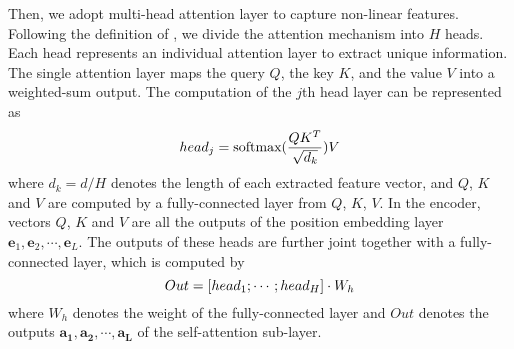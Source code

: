 Then, we adopt multi-head attention layer to capture non-linear features. Following the definition of \citet{transformer}, we divide the attention mechanism into $H$ heads. Each head represents an individual attention layer to extract unique information. The single attention layer maps the query $Q$, the key $K$, and the value $V$ into a weighted-sum output. The computation of the $j$th head layer can be represented as
\begin{equation}
    \vspace{-2mm}
    head_j = \text{softmax}(\frac{QK^T}{\sqrt{d_k}})V\label{eq:att2}
    \vspace{-1mm}
\end{equation}
where $d_k = d/H$ denotes the length of each extracted feature vector, and $Q$, $K$ and $V$ are computed by a fully-connected layer from $Q$, $K$, $V$. In the encoder, vectors $Q$, $K$ and $V$ are all the outputs of the position embedding layer $\bm{e}_1, \bm{e}_2, \cdots, \bm{e}_L$. The outputs of these heads are further joint together with a fully-connected layer, which is computed by
\begin{equation}
    \vspace{-1mm}
    Out = [head_1;\cdots;head_H]\cdot W_h \label{eq:att3}
    \vspace{-1mm}
\end{equation}
where $W_h$ denotes the weight of the fully-connected layer and $Out$ denotes the outputs $\bm{a_1}, \bm{a_2}, \cdots{}, \bm{a_L}$ of the self-attention sub-layer. %

